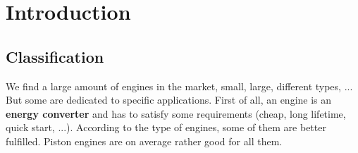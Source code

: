 
\chapter{Introduction}
%	
%		
		
	
		
		

\section{Classification}
	We find a large amount of engines in the market, small, large, different types, ... But some are dedicated to specific applications. First of all, an engine is an \textbf{energy converter} and has to satisfy some requirements (cheap, long lifetime, quick start, ...). According to the type of engines, some of them are better fulfilled. Piston engines are on average rather good for all them. \\
	
